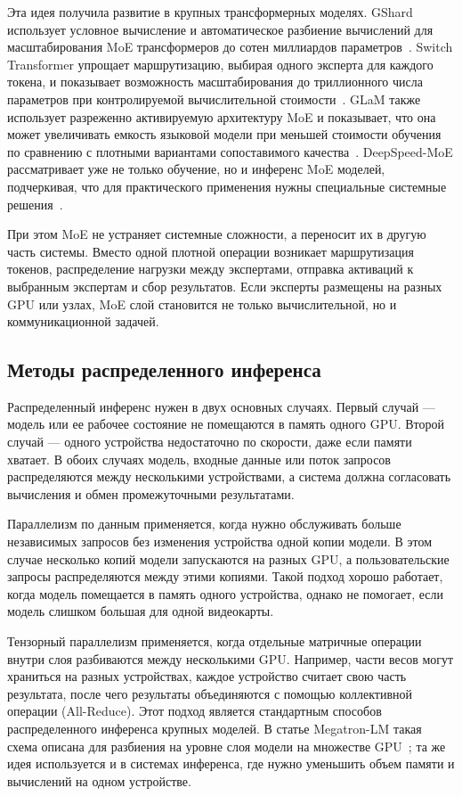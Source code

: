 Эта идея получила развитие в крупных трансформерных моделях. GShard использует условное вычисление и автоматическое разбиение вычислений для масштабирования MoE трансформеров до сотен миллиардов параметров~\cite{lepikhin2020gshard}. Switch Transformer упрощает маршрутизацию, выбирая одного эксперта для каждого токена, и показывает возможность масштабирования до триллионного числа параметров при контролируемой вычислительной стоимости~\cite{fedus2021switch}. GLaM также использует разреженно активируемую архитектуру MoE и показывает, что она может увеличивать емкость языковой модели при меньшей стоимости обучения по сравнению с плотными вариантами сопоставимого качества~\cite{du2021glam}. DeepSpeed-MoE рассматривает уже не только обучение, но и инференс MoE моделей, подчеркивая, что для практического применения нужны специальные системные решения~\cite{rajbhandari2022deepspeedmoe}.

При этом MoE не устраняет системные сложности, а переносит их в другую часть системы. Вместо одной плотной операции возникает маршрутизация токенов, распределение нагрузки между экспертами, отправка активаций к выбранным экспертам и сбор результатов. Если эксперты размещены на разных GPU или узлах, MoE слой становится не только вычислительной, но и коммуникационной задачей.

\subsection{Методы распределенного инференса}

Распределенный инференс нужен в двух основных случаях. Первый случай --- модель или ее рабочее состояние не помещаются в память одного GPU. Второй случай --- одного устройства недостаточно по скорости, даже если памяти хватает. В обоих случаях модель, входные данные или поток запросов распределяются между несколькими устройствами, а система должна согласовать вычисления и обмен промежуточными результатами.

Параллелизм по данным применяется, когда нужно обслуживать больше независимых запросов без изменения устройства одной копии модели. В этом случае несколько копий модели запускаются на разных GPU, а пользовательские запросы распределяются между этими копиями. Такой подход хорошо работает, когда модель помещается в память одного устройства, однако не помогает, если модель слишком большая для одной видеокарты.

Тензорный параллелизм применяется, когда отдельные матричные операции внутри слоя разбиваются между несколькими GPU. Например, части весов могут храниться на разных устройствах, каждое устройство считает свою часть результата, после чего результаты объединяются с помощью коллективной операции (All-Reduce). Этот подход является стандартным способов распределенного инференса крупных моделей. В статье Megatron-LM такая схема описана для разбиения на уровне слоя модели на множестве GPU~\cite{shoeybi2019megatron}; та же идея используется и в системах инференса, где нужно уменьшить объем памяти и вычислений на одном устройстве.

